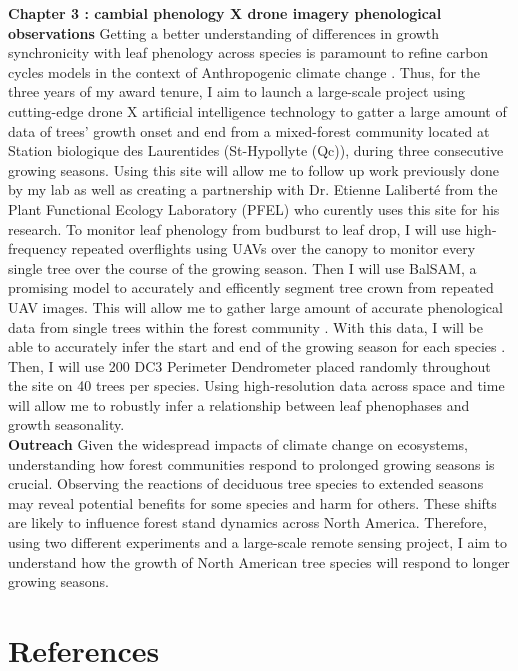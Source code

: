 \documentclass[12pt]{article}
\begin{document}
\textbf{Chapter 3 : cambial phenology X drone imagery phenological observations}
Getting a better understanding of differences in growth synchronicity with leaf phenology across species is paramount to refine carbon cycles models in the context of Anthropogenic climate change \citep{klein_coordination_2016,kramer_importance_2000,richardson_climate_2013,swidrak_comparing_2013}. Thus, for the three years of my award tenure, I aim to launch a large-scale project using cutting-edge drone X artificial intelligence technology \citep{ball_accurate_2023,teng_bringing_2025,ulku_deep_2022} to gatter a large amount of data of trees' growth onset and end from a mixed-forest community located at Station biologique des Laurentides (St-Hypollyte (Qc)), during three consecutive growing seasons. Using this site will allow me to follow up work previously done by my lab as well as creating a partnership with Dr. Etienne Laliberté from the Plant Functional Ecology Laboratory (PFEL) who curently uses this site for his research. To monitor leaf phenology from budburst to leaf drop, I will use high-frequency repeated overflights using UAVs over the canopy to monitor every single tree over the course of the growing season. Then I will use BalSAM, a promising model to accurately and efficently segment tree crown from repeated UAV images. This will allow me to gather large amount of accurate phenological data from single trees within the forest community \cite{teng_bringing_2025}. With this data, I will be able to accurately infer the start and end of the growing season for each species \citep{berra_assessing_2019,fawcett_monitoring_2021}. Then, I will use 200 DC3 Perimeter Dendrometer placed randomly throughout the site on 40 trees per species. Using high-resolution data across space and time will allow me to robustly infer a relationship between leaf phenophases and growth seasonality.\\


\textbf{Outreach}
Given the widespread impacts of climate change on ecosystems, understanding how forest communities respond to prolonged growing seasons is crucial. Observing the reactions of deciduous tree species to extended seasons may reveal potential benefits for some species and harm for others. These shifts are likely to influence forest stand dynamics across North America. Therefore, using two different experiments and a large-scale remote sensing project, I aim to understand how the growth of North American tree species will respond to longer growing seasons.  
\section*{References}

\end{document}
